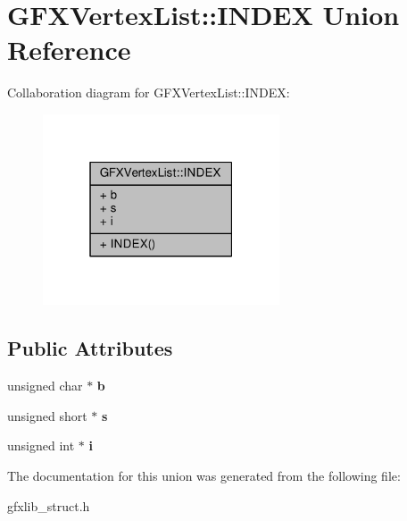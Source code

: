 \hypertarget{unionGFXVertexList_1_1INDEX}{}\section{G\+F\+X\+Vertex\+List\+:\+:I\+N\+D\+EX Union Reference}
\label{unionGFXVertexList_1_1INDEX}


Collaboration diagram for G\+F\+X\+Vertex\+List\+:\+:I\+N\+D\+EX\+:
\nopagebreak
\begin{figure}[H]
\begin{center}
\leavevmode
\includegraphics[width=199pt]{d5/dfe/unionGFXVertexList_1_1INDEX__coll__graph}
\end{center}
\end{figure}
\subsection*{Public Attributes}
\begin{DoxyCompactItemize}
\item 
unsigned char $\ast$ {\bfseries b}\hypertarget{unionGFXVertexList_1_1INDEX_af1bac40fa6d9d46677435cf56088da3d}{}\label{unionGFXVertexList_1_1INDEX_af1bac40fa6d9d46677435cf56088da3d}

\item 
unsigned short $\ast$ {\bfseries s}\hypertarget{unionGFXVertexList_1_1INDEX_a6c7919362e8a3b5806441a9032be043b}{}\label{unionGFXVertexList_1_1INDEX_a6c7919362e8a3b5806441a9032be043b}

\item 
unsigned int $\ast$ {\bfseries i}\hypertarget{unionGFXVertexList_1_1INDEX_ae6a0d39ec97139cfeb3f4feccd2d417e}{}\label{unionGFXVertexList_1_1INDEX_ae6a0d39ec97139cfeb3f4feccd2d417e}

\end{DoxyCompactItemize}


The documentation for this union was generated from the following file\+:\begin{DoxyCompactItemize}
\item 
gfxlib\+\_\+struct.\+h\end{DoxyCompactItemize}
